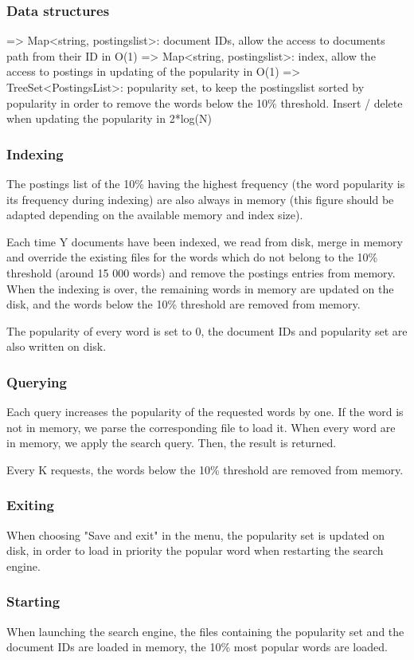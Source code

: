 \subsubsection{Data structures}
=> Map<string, postingslist>: document IDs, allow the access to documents path from their ID in O(1)
=> Map<string, postingslist>: index, allow the access to postings in updating of the popularity in O(1)
=> TreeSet<PostingsList>: popularity set, to keep the postingslist sorted by popularity in order to remove the words below the 10\% threshold. Insert / delete when updating the popularity in 2*log(N)

\subsubsection{Indexing}
The postings list of the 10\% having the highest frequency (the word popularity is its frequency during indexing) are also always in memory (this figure should be adapted depending on the available memory and index size).

Each time Y documents have been indexed, we read from disk, merge in memory and override the existing files for the words which do not belong to the 10\% threshold (around 15 000 words) and remove the postings entries from memory.
When the indexing is over, the remaining words in memory are updated on the disk, and the words below the 10\% threshold are removed from memory.

The popularity of every word is set to 0, the document IDs and popularity set are also written on disk.

\subsubsection{Querying}
Each query increases the popularity of the requested words by one.
If the word is not in memory, we parse the corresponding file to load it.
When every word are in memory, we apply the search query.
Then, the result is returned.

Every K requests, the words below the 10\% threshold are removed from memory.

\subsubsection{Exiting}
When choosing "Save and exit" in the menu, the popularity set is updated on disk, in order to load in priority the popular word when restarting the search engine.

\subsubsection{Starting}
When launching the search engine, the files containing the popularity set and the document IDs are loaded in memory, the 10\% most popular words are loaded.
